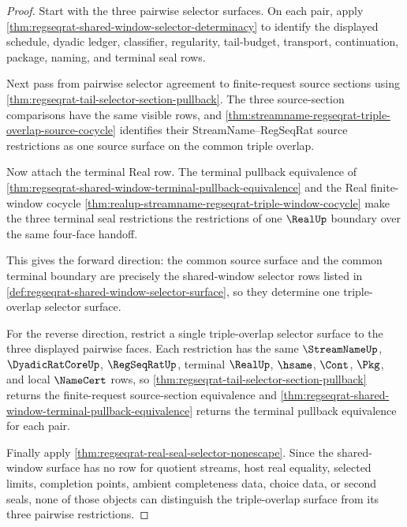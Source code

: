 \begin{proof}
Start with the three pairwise selector surfaces. On each pair, apply \autoref{thm:regseqrat-shared-window-selector-determinacy} to identify the displayed schedule, dyadic ledger, classifier, regularity, tail-budget, transport, continuation, package, naming, and terminal seal rows.

Next pass from pairwise selector agreement to finite-request source sections using \autoref{thm:regseqrat-tail-selector-section-pullback}. The three source-section comparisons have the same visible rows, and \autoref{thm:streamname-regseqrat-triple-overlap-source-cocycle} identifies their StreamName--RegSeqRat source restrictions as one source surface on the common triple overlap.

Now attach the terminal Real row. The terminal pullback equivalence of \autoref{thm:regseqrat-shared-window-terminal-pullback-equivalence} and the Real finite-window cocycle \autoref{thm:realup-streamname-regseqrat-triple-window-cocycle} make the three terminal seal restrictions the restrictions of one $\RealUp$ boundary over the same four-face handoff.

This gives the forward direction: the common source surface and the common terminal boundary are precisely the shared-window selector rows listed in \autoref{def:regseqrat-shared-window-selector-surface}, so they determine one triple-overlap selector surface.

For the reverse direction, restrict a single triple-overlap selector surface to the three displayed pairwise faces. Each restriction has the same $\StreamNameUp$, $\DyadicRatCoreUp$, $\RegSeqRatUp$, terminal $\RealUp$, $\hsame$, $\Cont$, $\Pkg$, and local $\NameCert$ rows, so \autoref{thm:regseqrat-tail-selector-section-pullback} returns the finite-request source-section equivalence and \autoref{thm:regseqrat-shared-window-terminal-pullback-equivalence} returns the terminal pullback equivalence for each pair.

Finally apply \autoref{thm:regseqrat-real-seal-selector-nonescape}. Since the shared-window surface has no row for quotient streams, host real equality, selected limits, completion points, ambient completeness data, choice data, or second seals, none of those objects can distinguish the triple-overlap surface from its three pairwise restrictions.
\end{proof}


